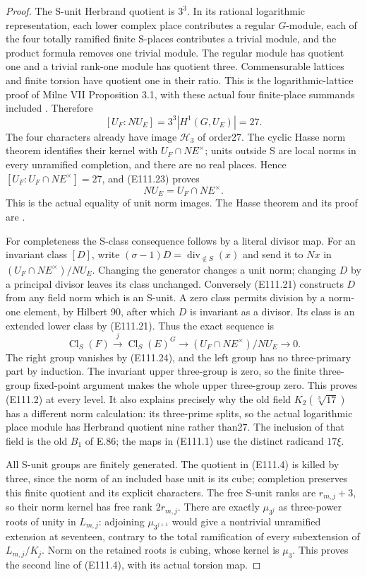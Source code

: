 \begin{proof}
The S-unit Herbrand quotient is $3^3$. In its rational
logarithmic representation, each lower complex place
contributes a regular $G$-module, each of the four totally
ramified finite S-places contributes a trivial module,
and the product formula removes one trivial module.
The regular module has quotient one and a trivial
rank-one module has quotient three. Commensurable
lattices and finite torsion have quotient one in their
ratio. This is the logarithmic-lattice proof of Milne
VII Proposition 3.1, with these actual four finite-place
summands included \cite{E_MilneCFT}. Therefore
\[
 [U_F:NU_E]=3^3|H^1(G,U_E)|=27.
 \tag{E111.23}
\]
The four characters already have image $\mathcal H_3$ of
order27. The cyclic Hasse norm theorem identifies their
kernel with $U_F\cap NE^\times$; units outside S are
local norms in every unramified completion, and there
are no real places. Hence
$[U_F:U_F\cap NE^\times]=27$, and (E111.23) proves
\[
                         NU_E=U_F\cap NE^\times.
 \tag{E111.24}
\]
This is the actual equality of unit norm images.
The Hasse theorem and its proof are
\cite[VIII, Theorem 3.1]{E_MilneCFT}.

For completeness the S-class consequence follows by a
literal divisor map. For an invariant class $[D]$, write
$(\sigma-1)D=\operatorname{div}_{\notin S}(x)$ and send it
to $Nx$ in $(U_F\cap NE^\times)/NU_E$.
Changing the generator changes a unit norm; changing
$D$ by a principal divisor leaves its class unchanged.
Conversely (E111.21) constructs $D$ from any field norm
which is an S-unit. A zero class permits division by a
norm-one element, by Hilbert 90, after which $D$ is
invariant as a divisor. Its class is an extended lower
class by (E111.21). Thus the exact sequence is
\[
 \operatorname{Cl}_S(F)\xrightarrow{j}
    \operatorname{Cl}_S(E)^G\longrightarrow
       (U_F\cap NE^\times)/NU_E\longrightarrow0.
 \tag{E111.25}
\]
The right group vanishes by (E111.24), and the left
group has no three-primary part by induction. The
invariant upper three-group is zero, so the finite
three-group fixed-point argument makes the whole upper
three-group zero. This proves (E111.2) at every level.
It also explains precisely why the old field
$K_2(\sqrt[3]{17})$ has a different norm calculation:
its three-prime splits, so the actual logarithmic
place module has Herbrand quotient nine rather than27.
The inclusion of that field is the old $B_1$ of E.86;
the maps in (E111.1) use the distinct radicand $17\xi$.

All S-unit groups are finitely generated. The quotient
in (E111.4) is killed by three, since the norm of an
included base unit is its cube; completion preserves
this finite quotient and its explicit characters.
The free S-unit ranks are $r_{m,j}+3$, so their norm
kernel has free rank $2r_{m,j}$. There are exactly
$\mu_{3^j}$ as three-power roots of unity in $L_{m,j}$:
adjoining $\mu_{3^{j+1}}$ would give a nontrivial
unramified extension at seventeen, contrary to the
total ramification of every subextension of
$L_{m,j}/K_j$. Norm on the retained roots is cubing,
whose kernel is $\mu_3$. This proves the second line
of (E111.4), with its actual torsion map.


\end{proof}
